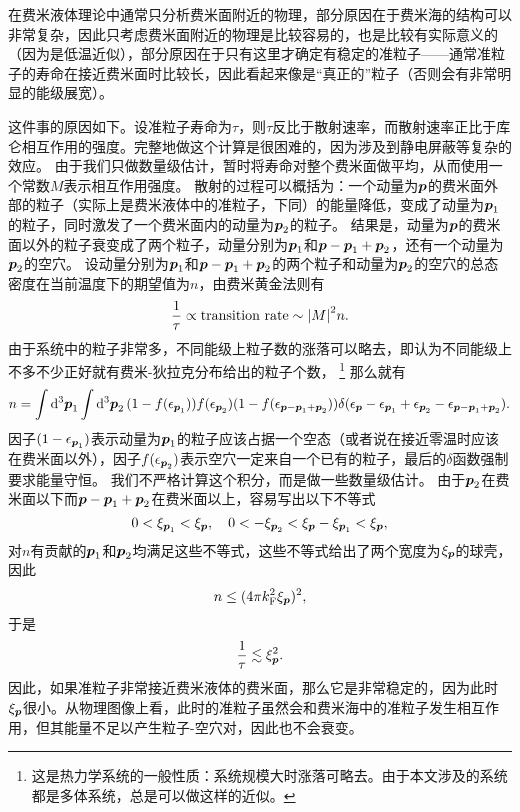 \documentclass[hyperref, UTF8, a4paper]{ctexart}
\begin{document}
在费米液体理论中通常只分析费米面附近的物理，部分原因在于费米海的结构可以非常复杂，因此只考虑费米面附近的物理是比较容易的，也是比较有实际意义的（因为是低温近似），部分原因在于只有这里才确定有稳定的准粒子——通常准粒子的寿命在接近费米面时比较长，因此看起来像是“真正的”粒子（否则会有非常明显的能级展宽）。

这件事的原因如下。设准粒子寿命为$\tau$，则$\tau$反比于散射速率，而散射速率正比于库仑相互作用的强度。完整地做这个计算是很困难的，因为涉及到静电屏蔽等复杂的效应。
由于我们只做数量级估计，暂时将寿命对整个费米面做平均，从而使用一个常数$M$表示相互作用强度。
散射的过程可以概括为：一个动量为$\vb*{p}$的费米面外部的粒子（实际上是费米液体中的准粒子，下同）的能量降低，变成了动量为$\vb*{p}_1$的粒子，同时激发了一个费米面内的动量为$\vb*{p}_2$的粒子。
结果是，动量为$\vb*{p}$的费米面以外的粒子衰变成了两个粒子，动量分别为$\vb*{p}_1$和$\vb*{p} - \vb*{p}_1 + \vb*{p}_2$，还有一个动量为$\vb*{p}_2$的空穴。
设动量分别为$\vb*{p}_1$和$\vb*{p} - \vb*{p}_1 + \vb*{p}_2$的两个粒子和动量为$\vb*{p}_2$的空穴的总态密度在当前温度下的期望值为$n$，由费米黄金法则有
\[
    \frac{1}{\tau} \propto \text{transition rate} \sim \abs{M}^2 n.
\]
由于系统中的粒子非常多，不同能级上粒子数的涨落可以略去，即认为不同能级上不多不少正好就有费米-狄拉克分布给出的粒子个数，%
\footnote{这是热力学系统的一般性质：系统规模大时涨落可略去。由于本文涉及的系统都是多体系统，总是可以做这样的近似。}%
那么就有
\[
    n = \int \dd[3]{\vb*{p}_1} \int \dd[3]{\vb*{p}_2} (1 - f(\epsilon_{\vb*{p}_1})) f(\epsilon_{\vb*{p}_2}) (1 - f(\epsilon_{\vb*{p} - \vb*{p}_1 + \vb*{p}_2})) \delta(\epsilon_{\vb*{p}} - \epsilon_{\vb*{p}_1} + \epsilon_{\vb*{p}_2} - \epsilon_{\vb*{p} - \vb*{p}_1 + \vb*{p}_2}).
\]
因子$(1-\epsilon_{\vb*{p}_1})$表示动量为$\vb*{p}_1$的粒子应该占据一个空态（或者说在接近零温时应该在费米面以外），因子$f(\epsilon_{\vb*{p}_2})$表示空穴一定来自一个已有的粒子，最后的$\delta$函数强制要求能量守恒。
我们不严格计算这个积分，而是做一些数量级估计。
由于$\vb*{p}_2$在费米面以下而$\vb*{p}- \vb*{p}_1 + \vb*{p}_2$在费米面以上，容易写出以下不等式
\[
    0 < \xi_{\vb*{p}_1} < \xi_{\vb*{p}}, \quad 0 < - \xi_{\vb*{p}_2} < \xi_{\vb*{p}} - \xi_{\vb*{p}_1} < \xi_{\vb*{p}},
\]
对$n$有贡献的$\vb*{p}_1$和$\vb*{p}_2$均满足这些不等式，这些不等式给出了两个宽度为$\xi_{\vb*{p}}$的球壳，因此
\[
    n \leq (4 \pi k_\text{F}^2 \xi_{\vb*{p}})^2,
\]
于是
\begin{equation}
    \frac{1}{\tau} \lesssim \xi_{\vb*{p}}^2.
\end{equation}
因此，如果准粒子非常接近费米液体的费米面，那么它是非常稳定的，因为此时$\xi_{\vb*{p}}$很小。从物理图像上看，此时的准粒子虽然会和费米海中的准粒子发生相互作用，但其能量不足以产生粒子-空穴对，因此也不会衰变。
\end{document}
